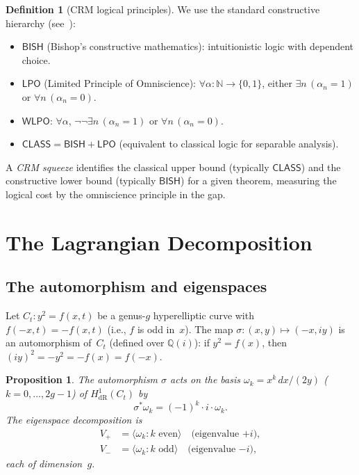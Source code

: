 \documentclass[11pt]{article}
\theoremstyle{plain}
\newtheorem{proposition}[theorem]{Proposition}
\theoremstyle{definition}
\newtheorem{definition}[theorem]{Definition}
\theoremstyle{remark}
\newcommand{\N}{\mathbb{N}}
\newcommand{\Q}{\mathbb{Q}}
\newcommand{\BISH}{\ensuremath{\mathsf{BISH}}}
\newcommand{\LPO}{\ensuremath{\mathsf{LPO}}}
\newcommand{\WLPO}{\ensuremath{\mathsf{WLPO}}}
\newcommand{\CLASS}{\ensuremath{\mathsf{CLASS}}}
\newcommand{\HdR}{H^1_{\mathrm{dR}}}
\begin{document}
\begin{definition}[CRM logical principles]\label{def:crm}
We use the standard constructive hierarchy
(see~\cite{BridgesRichman1987}):
\begin{itemize}[nosep]
\item $\BISH$ (Bishop's constructive mathematics): intuitionistic
  logic with dependent choice.
\item $\LPO$ (Limited Principle of Omniscience):
  $\forall \alpha\colon \N \to \{0,1\}$, either $\exists n\, (\alpha_n = 1)$
  or $\forall n\, (\alpha_n = 0)$.
\item $\WLPO$: $\forall \alpha$, $\lnot\lnot\exists n\, (\alpha_n = 1)$
  or $\forall n\, (\alpha_n = 0)$.
\item $\CLASS = \BISH + \LPO$ (equivalent to classical logic for
  separable analysis).
\end{itemize}
A \emph{CRM squeeze} identifies the classical upper bound
(typically $\CLASS$) and the constructive lower bound
(typically $\BISH$) for a given theorem, measuring the logical
cost by the omniscience principle in the gap.
\end{definition}

\section{The Lagrangian Decomposition}\label{sec:lagrangian}

\subsection{The automorphism and eigenspaces}

Let $C_t\colon y^2 = f(x,t)$ be a genus-$g$ hyperelliptic curve with
$f(-x,t) = -f(x,t)$ (i.e., $f$ is odd in~$x$).  The map
$\sigma\colon (x,y) \mapsto (-x, iy)$ is an automorphism of~$C_t$
(defined over $\Q(i)$): if $y^2 = f(x)$, then
$(iy)^2 = -y^2 = -f(x) = f(-x)$.

\begin{proposition}\label{prop:eigenvalues}
The automorphism $\sigma$ acts on the basis
$\omega_k = x^k\, dx/(2y)$ ($k = 0,\ldots,2g-1$) of $\HdR(C_t)$ by
\[
  \sigma^*\omega_k = (-1)^k \cdot i \cdot \omega_k.
\]
The eigenspace decomposition is
\begin{align*}
  V_+ &= \langle\omega_k : k \text{ even}\rangle
  \quad\text{(eigenvalue $+i$)}, \\
  V_- &= \langle\omega_k : k \text{ odd}\rangle
  \quad\text{(eigenvalue $-i$)},
\end{align*}
each of dimension~$g$.
\end{proposition}
\end{document}
